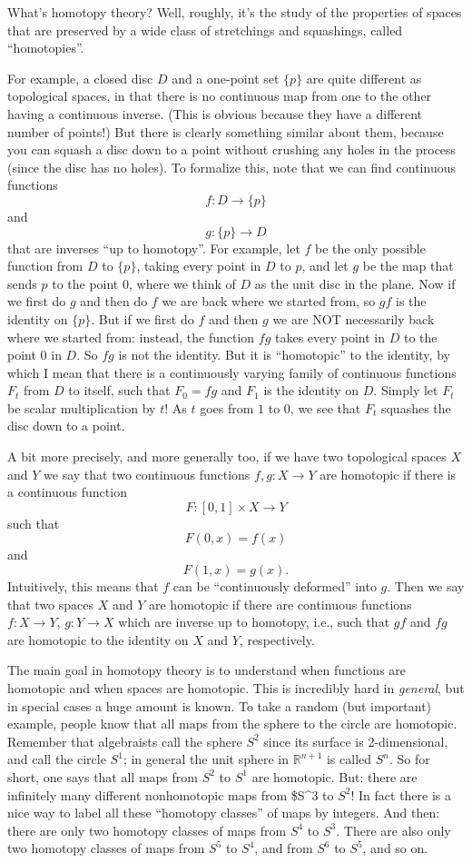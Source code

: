\documentclass{article}
\begin{document}
What's homotopy theory? Well, roughly, it's the study of the properties
of spaces that are preserved by a wide class of stretchings and
squashings, called ``homotopies''.

For example, a closed disc \(D\) and a one-point set \(\{p\}\) are quite
different as topological spaces, in that there is no continuous map from
one to the other having a continuous inverse. (This is obvious because
they have a different number of points!) But there is clearly something
similar about them, because you can squash a disc down to a point
without crushing any holes in the process (since the disc has no holes).
To formalize this, note that we can find continuous functions
\[f\colon D\to\{p\}\] and \[g\colon\{p\}\to D\] that are inverses ``up
to homotopy''. For example, let \(f\) be the only possible function from
\(D\) to \(\{p\}\), taking every point in \(D\) to \(p\), and let \(g\)
be the map that sends \(p\) to the point \(0\), where we think of \(D\)
as the unit disc in the plane. Now if we first do \(g\) and then do
\(f\) we are back where we started from, so \(gf\) is the identity on
\(\{p\}\). But if we first do \(f\) and then \(g\) we are NOT
necessarily back where we started from: instead, the function \(fg\)
takes every point in \(D\) to the point \(0\) in \(D\). So \(fg\) is not
the identity. But it is ``homotopic'' to the identity, by which I mean
that there is a continuously varying family of continuous functions
\(F_t\) from \(D\) to itself, such that \(F_0 = fg\) and \(F_1\) is the
identity on \(D\). Simply let \(F_t\) be scalar multiplication by \(t\)!
As \(t\) goes from \(1\) to \(0\), we see that \(F_t\) squashes the disc
down to a point.

A bit more precisely, and more generally too, if we have two topological
spaces \(X\) and \(Y\) we say that two continuous functions
\(f,g\colon X \to Y\) are homotopic if there is a continuous function
\[F\colon[0,1]\times X\to Y\] such that \[F(0,x)=f(x)\] and
\[F(1,x) = g(x).\] Intuitively, this means that \(f\) can be
``continuously deformed'' into \(g\). Then we say that two spaces \(X\)
and \(Y\) are homotopic if there are continuous functions
\(f\colon X\to Y\), \(g\colon Y \to X\) which are inverse up to
homotopy, i.e., such that \(gf\) and \(fg\) are homotopic to the
identity on \(X\) and \(Y\), respectively.

The main goal in homotopy theory is to understand when functions are
homotopic and when spaces are homotopic. This is incredibly hard in
\emph{general}, but in special cases a huge amount is known. To take a
random (but important) example, people know that all maps from the
sphere to the circle are homotopic. Remember that algebraists call the
sphere \(S^2\) since its surface is 2-dimensional, and call the circle
\(S^1\); in general the unit sphere in \(\mathbb{R}^{n+1}\) is called
\(S^n\). So for short, one says that all maps from \(S^2\) to \(S^1\)
are homotopic. But: there are infinitely many different nonhomotopic
maps from \$S\^{}3 to \(S^2\)! In fact there is a nice way to label all
these ``homotopy classes'' of maps by integers. And then: there are only
two homotopy classes of maps from \(S^4\) to \(S^3\). There are also
only two homotopy classes of maps from \(S^5\) to \(S^4\), and from
\(S^6\) to \(S^5\), and so on.
\end{document}
